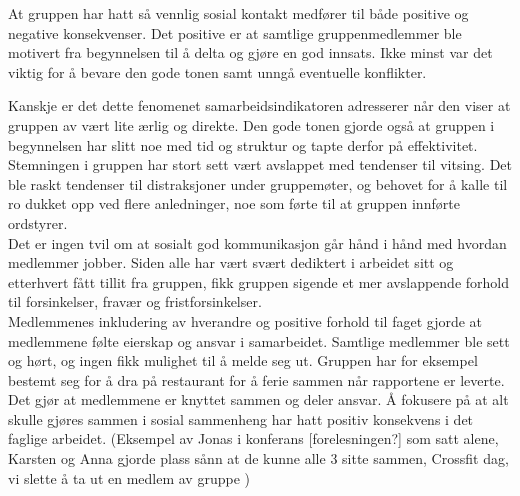 At gruppen har hatt så vennlig sosial kontakt medfører til både positive og negative konsekvenser.
Det positive er at samtlige gruppenmedlemmer ble motivert fra begynnelsen til å delta og gjøre en god innsats.
Ikke minst var det viktig for å bevare den gode tonen samt unngå eventuelle konflikter.

Kanskje er det dette fenomenet samarbeidsindikatoren adresserer når den viser at gruppen av vært lite ærlig og direkte.
Den gode tonen gjorde også at gruppen i begynnelsen har slitt noe med tid og struktur og tapte derfor på effektivitet. \\

Stemningen i gruppen har stort sett vært avslappet med tendenser til vitsing.
Det ble raskt tendenser til distraksjoner under gruppemøter, og behovet for å kalle til ro dukket opp ved flere anledninger, noe som førte til at gruppen innførte ordstyrer. \\

Det er ingen tvil om at sosialt god kommunikasjon går hånd i hånd med hvordan medlemmer jobber.
Siden alle har vært svært dediktert i arbeidet sitt og etterhvert fått tillit fra gruppen, fikk gruppen sigende et mer avslappende forhold til forsinkelser, fravær og fristforsinkelser. \\

Medlemmenes inkludering av hverandre og positive forhold til faget gjorde at medlemmene følte eierskap og ansvar i samarbeidet.
Samtlige medlemmer ble sett og hørt, og ingen fikk mulighet til å melde seg ut.
Gruppen har for eksempel bestemt seg for å dra på restaurant for å ferie sammen når rapportene er leverte. 
Det gjør at medlemmene er knyttet sammen og deler ansvar.
Å fokusere på at alt skulle gjøres sammen i sosial sammenheng har hatt positiv konsekvens i det faglige arbeidet.
\iffalse
(Eksempel av Jonas i konferans [forelesningen?] som satt alene, Karsten og Anna gjorde plass sånn at de kunne alle 3 sitte sammen, Crossfit dag, vi slette å ta ut en medlem av gruppe )


